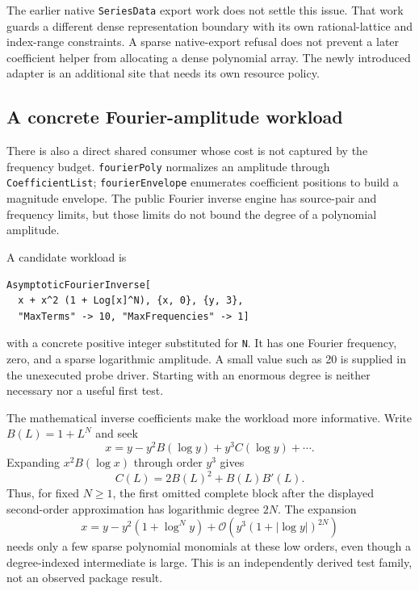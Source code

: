 \documentclass[11pt,a4paper]{article}
\newcommand{\code}[1]{\texttt{#1}}
\newcommand{\OO}{\mathcal{O}}
\begin{document}
The earlier native \code{SeriesData} export work does not settle this issue. That work guards a different dense representation boundary with its own rational-lattice and index-range constraints. A sparse native-export refusal does not prevent a later coefficient helper from allocating a dense polynomial array. The newly introduced adapter is an additional site that needs its own resource policy.\cite{register,algebra}

\subsection{A concrete Fourier-amplitude workload}
There is also a direct shared consumer whose cost is not captured by the frequency budget. \code{fourierPoly} normalizes an amplitude through \code{CoefficientList}; \code{fourierEnvelope} enumerates coefficient positions to build a magnitude envelope. The public Fourier inverse engine has source-pair and frequency limits, but those limits do not bound the degree of a polynomial amplitude.\cite{fourier}

A candidate workload is
\begin{lstlisting}[language=Wolfram]
AsymptoticFourierInverse[
  x + x^2 (1 + Log[x]^N), {x, 0}, {y, 3},
  "MaxTerms" -> 10, "MaxFrequencies" -> 1]
\end{lstlisting}
with a concrete positive integer substituted for \code{N}. It has one Fourier frequency, zero, and a sparse logarithmic amplitude. A small value such as 20 is supplied in the unexecuted probe driver. Starting with an enormous degree is neither necessary nor a useful first test.

The mathematical inverse coefficients make the workload more informative. Write $B(L)=1+L^N$ and seek
\begin{equation}
 x=y-y^2B(\log y)+y^3 C(\log y)+\cdots.
\end{equation}
Expanding $x^2B(\log x)$ through order $y^3$ gives
\begin{equation}
 C(L)=2B(L)^2+B(L)B'(L).
\end{equation}
Thus, for fixed $N\ge1$, the first omitted complete block after the displayed second-order approximation has logarithmic degree $2N$. The expansion
\begin{equation}
 x=y-y^2(1+\log^N y)
 +\OO\!\left(y^3(1+|\log y|)^{2N}\right)
\end{equation}
needs only a few sparse polynomial monomials at these low orders, even though a degree-indexed intermediate is large. This is an independently derived test family, not an observed package result.
\end{document}
